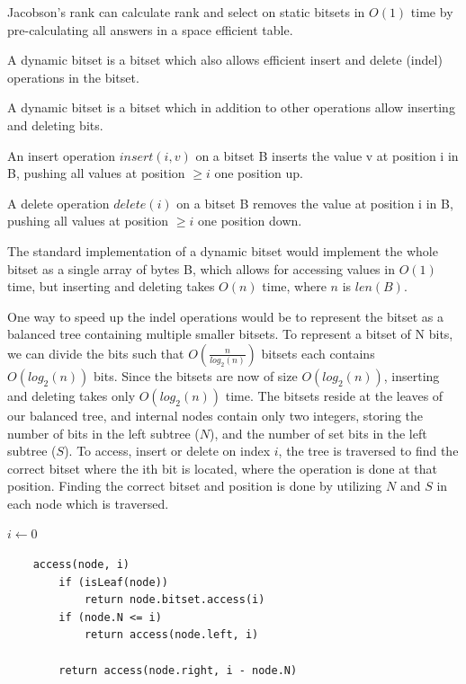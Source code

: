Jacobson's rank can calculate rank and select on static bitsets in $O(1)$ time by
pre-calculating all answers in a space efficient table.

A dynamic bitset is a bitset which also allows efficient insert and delete (indel) operations in the
bitset.

\begin{definition}
    A dynamic bitset is a bitset which in addition to other operations allow inserting and
    deleting bits.

    An insert operation $insert(i, v)$ on a bitset B inserts the value v at position i in
    B, pushing all values at position $\geq i$ one position up.

    A delete operation $delete(i)$ on a bitset B removes the value at position i in B, pushing all
    values at position $\geq i$ one position down.
\end{definition}

The standard implementation of a dynamic bitset would implement the whole bitset as a
single array of bytes B, which allows for accessing values in $O(1)$ time, but inserting
and deleting takes $O(n)$ time, where $n$ is $len(B)$.

One way to speed up the indel operations would be to represent the bitset as a balanced
tree containing multiple smaller bitsets. To represent a bitset of N bits, we can divide
the bits such that $O(\frac{n}{log_2(n)})$ bitsets each contains $O(log_2(n))$ bits. Since
the bitsets are now of size $O(log_2(n))$, inserting and deleting takes only $O(log_2(n))$
time. The bitsets reside at the leaves of our balanced tree, and internal nodes
contain only two integers, storing the number of bits in the left subtree ($N$), and the
number of set bits in the left subtree ($S$). To access, insert or delete on index $i$,
the tree is traversed to find the correct bitset where the ith bit is located, where the
operation is done at that position. Finding the correct bitset and position is done by
utilizing $N$ and $S$ in each node which is traversed.

\begin{algorithm}
    \begin{algorithmic}
        \State $i\gets 0$
        \EndFunction
    \end{algorithmic}
\end{algorithm}
\begin{lstlisting}
    access(node, i)
        if (isLeaf(node))
            return node.bitset.access(i)
        if (node.N <= i)
            return access(node.left, i)

        return access(node.right, i - node.N)
\end{lstlisting}

